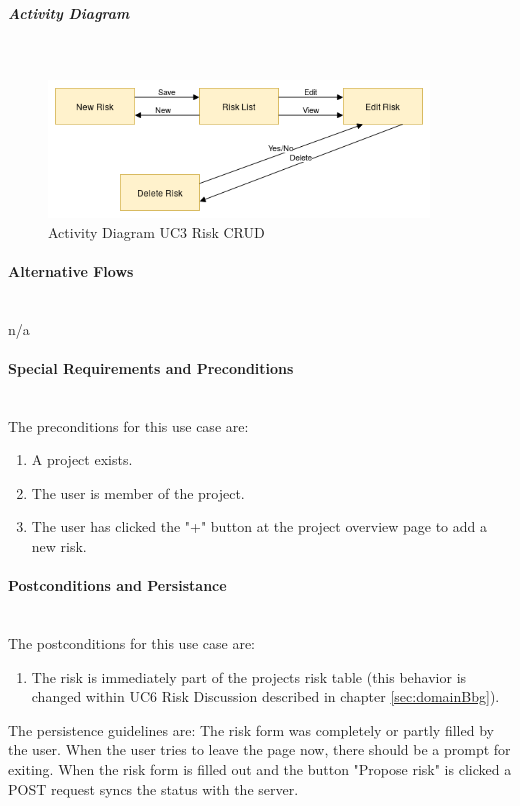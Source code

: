 \newpage
\subparagraph{Activity Diagram}\mbox{}\\
\begin{figure}[H]
	\centering
	\includegraphics[width=0.9\textwidth]{Content/Domain/UC3RiskCRUDactivitydiagram.png}
	\caption{Activity Diagram \ac{UC}3 Risk CRUD}
	\label{fig:activityDiagramUC3}
\end{figure}

\paragraph*{Alternative Flows}\mbox{}\\
n/a

\paragraph*{Special Requirements and Preconditions}\mbox{}\\
The preconditions for this use case are:
\begin{enumerate}
	\vspace{-3mm}
	\setlength\itemsep{-1em}
	\item A project exists.
	\item The user is member of the project.
	\item The user has clicked the "+" button at the project overview page to add a new risk.
\end{enumerate}

\paragraph*{Postconditions and Persistance}\mbox{}\\
The postconditions for this use case are:
\begin{enumerate}
	\vspace{-3mm}
	\setlength\itemsep{-1em}
	\item The risk is immediately part of the projects risk table (this behavior is changed within UC6 Risk Discussion described in chapter \ref{sec:domainBbg}).
\end{enumerate}

\noindent
The persistence guidelines are: 
\newline
\noindent
The risk form was completely or partly filled by the user. When the user tries to leave the page now, there should be a prompt for exiting. When the risk form is filled out and the button "Propose risk" is clicked a POST request syncs the status with the server.
